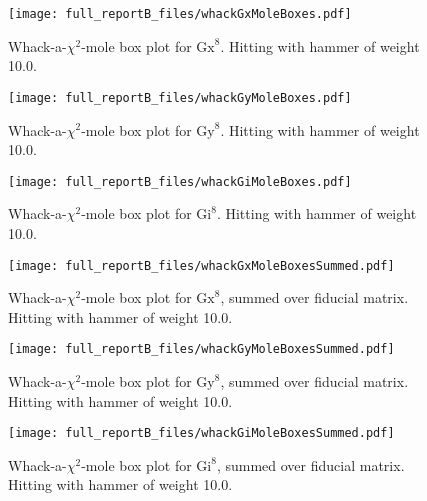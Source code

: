 {\begin{figure}
\begin{center}
\texttt{[image: full\_reportB\_files/whackGxMoleBoxes.pdf]}
\caption{Whack-a-$\chi^2$-mole box plot for $\mathrm{Gx}^{8}$.  Hitting with hammer of weight 10.0.\label{WhackGxMoleBoxPlot}}
\end{center}
\end{figure}

\begin{figure}
\begin{center}
\texttt{[image: full\_reportB\_files/whackGyMoleBoxes.pdf]}
\caption{Whack-a-$\chi^2$-mole box plot for $\mathrm{Gy}^{8}$.  Hitting with hammer of weight 10.0.\label{WhackGyMoleBoxPlot}}
\end{center}
\end{figure}

\begin{figure}
\begin{center}
\texttt{[image: full\_reportB\_files/whackGiMoleBoxes.pdf]}
\caption{Whack-a-$\chi^2$-mole box plot for $\mathrm{Gi}^{8}$.  Hitting with hammer of weight 10.0.\label{WhackGiMoleBoxPlot}}
\end{center}
\end{figure}

\begin{figure}
\begin{center}
\texttt{[image: full\_reportB\_files/whackGxMoleBoxesSummed.pdf]}
\caption{Whack-a-$\chi^2$-mole box plot for $\mathrm{Gx}^{8}$, summed over fiducial matrix.  Hitting with hammer of weight 10.0.\label{WhackGxMoleBoxPlotSummed}}
\end{center}
\end{figure}

\begin{figure}
\begin{center}
\texttt{[image: full\_reportB\_files/whackGyMoleBoxesSummed.pdf]}
\caption{Whack-a-$\chi^2$-mole box plot for $\mathrm{Gy}^{8}$, summed over fiducial matrix.  Hitting with hammer of weight 10.0.\label{WhackGyMoleBoxPlotSummed}}
\end{center}
\end{figure}

\begin{figure}
\begin{center}
\texttt{[image: full\_reportB\_files/whackGiMoleBoxesSummed.pdf]}
\caption{Whack-a-$\chi^2$-mole box plot for $\mathrm{Gi}^{8}$, summed over fiducial matrix.  Hitting with hammer of weight 10.0.\label{WhackGiMoleBoxPlotSummed}}
\end{center}
\end{figure}

}{}